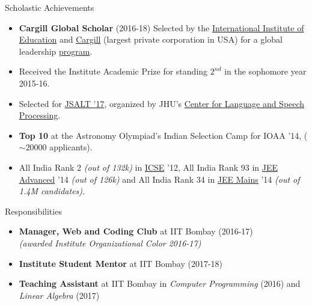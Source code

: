 \documentclass{resume} %
\begin{document}
\pagebreak 
\begin{rSection}{Scholastic Achievements}
\begin{itemize}[leftmargin=*]
\itemsep -0.5em 
\item \textbf{Cargill Global Scholar} (2016-18) Selected by the \href{https://en.wikipedia.org/wiki/Institute_of_International_Education}{International Institute of Education} and \href{https://en.wikipedia.org/wiki/Cargill}{Cargill} (largest private corporation in USA) for a global leadership \href{https://www.cargillglobalscholars.com/}{program}.
\item Received the Institute Academic Prize for standing $2^{nd}$ in the  sophomore year 2015-16.
\item Selected for \href{https://www.lti.cs.cmu.edu/2017-jsalt-undergraduate}{JSALT '17}, organized by JHU's \href{https://www.clsp.jhu.edu/}{Center for Language and Speech Processing}\footnotemark[2]. 
\item \textbf{Top 10} at the Astronomy Olympiad's Indian Selection Camp for IOAA '14, ($\sim$20000 applicants).
\item All India Rank 2 \textit{(out of 132k)} in \href{https://en.wikipedia.org/wiki/Indian_Certificate_of_Secondary_Education}{ICSE} '12, All India Rank 93 in \href{https://en.wikipedia.org/wiki/Joint_Entrance_Examination}{JEE Advanced} '14 \textit{(out of 126k)} and All India Rank 34 in \href{https://en.wikipedia.org/wiki/Joint_Entrance_Examination}{JEE Mains} '14 \textit{(out of 1.4M candidates)}.
\end{itemize}
\end{rSection}
\vspace*{-1.5mm}
\begin{rSection}{Responsibilities}
\begin{itemize}[leftmargin=*]
\itemsep -0.5em 
\item \textbf{Manager, Web and Coding Club} at IIT Bombay (2016-17)\\ \textit{(awarded Institute Organizational Color 2016-17)}
\item \textbf{Institute Student Mentor} at IIT Bombay (2017-18)
\item \textbf{Teaching Assistant} at IIT Bombay in \textit{Computer Programming} (2016) and \textit{Linear Algebra} (2017)
\end{itemize}
\end{rSection}
\end{document}
